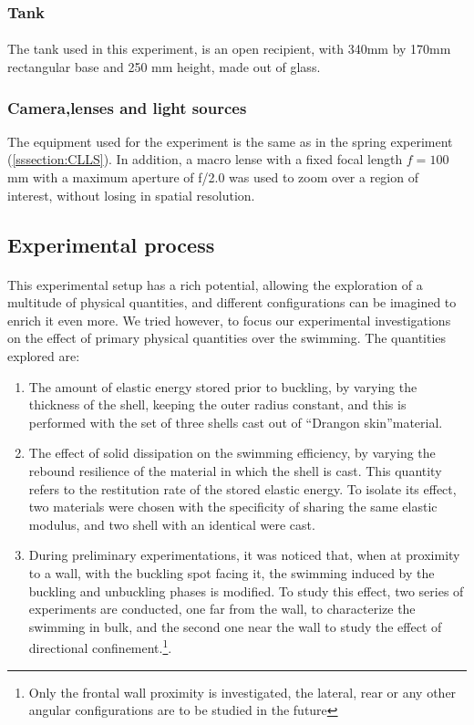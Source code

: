 \subsubsection{Tank}
\paragraph{}
The tank used in this experiment, is an open recipient, with 340mm by 170mm rectangular base and 250 mm height, made out of glass.  
\subsubsection{Camera,lenses and light sources}
The equipment used for the experiment is the same as in the spring experiment (\ref{sssection:CLLS}). In addition, a macro lense with a fixed focal length $f= 100$ mm with a maximum aperture of f/2.0 was used to zoom over a region of interest, without losing in spatial resolution.
  
\subsection{Experimental process}
\paragraph{}
This experimental setup has a rich potential, allowing the exploration of a multitude of physical quantities, and different configurations can be imagined to enrich it even more. We tried however, to focus our experimental investigations on the effect of primary physical quantities over the swimming. The quantities explored are:
\begin{enumerate}
	\item The amount of elastic energy stored prior to buckling, by varying the thickness of the shell, keeping the outer radius constant, and this is performed with the set of three shells cast out of "`Drangon skin"'\textregistered material.
	\item The effect of solid dissipation on the swimming efficiency, by varying the rebound resilience of the material in which the shell is cast. This quantity refers to the restitution rate of the stored elastic energy. To isolate its effect, two materials were chosen with the specificity of sharing the same elastic modulus, and two shell with an identical were cast.
	\item During preliminary experimentations, it was noticed that, when at proximity to a wall, with the buckling spot facing it, the swimming induced by the buckling and unbuckling phases is modified. To study this effect, two series of experiments are conducted, one far from the wall, to characterize the swimming in bulk, and the second one near the wall to study the effect of directional confinement.\footnote{Only the frontal wall proximity is investigated, the lateral, rear or any other angular configurations are to be studied in the future}. 
\end{enumerate}
